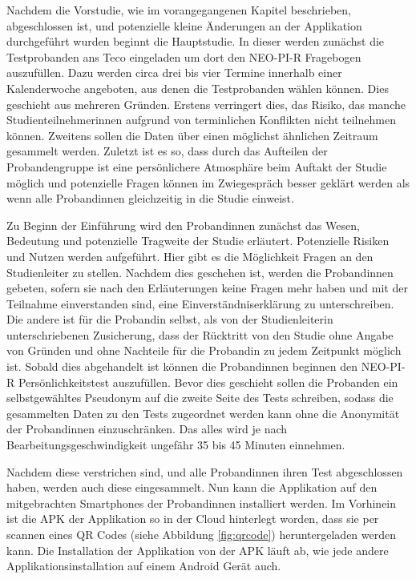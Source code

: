 Nachdem die Vorstudie, wie im vorangegangenen Kapitel beschrieben, abgeschlossen ist, und potenzielle kleine Änderungen an der Applikation durchgeführt wurden beginnt die Hauptstudie.
In dieser werden zunächst die Testprobanden ans Teco eingeladen um dort den NEO-PI-R Fragebogen auszufüllen.
Dazu werden circa drei bis vier Termine innerhalb einer Kalenderwoche angeboten, aus denen die Testprobanden wählen können.
Dies geschieht aus mehreren Gründen. 
Erstens verringert dies, das Risiko, das manche Studienteilnehmerinnen aufgrund von terminlichen Konflikten nicht teilnehmen können.
Zweitens sollen die Daten über einen möglichst ähnlichen Zeitraum gesammelt werden.
Zuletzt ist es so, dass durch das Aufteilen der Probandengruppe ist eine persönlichere Atmosphäre beim Auftakt der Studie möglich
und potenzielle Fragen können im Zwiegespräch besser geklärt werden als wenn alle Probandinnen gleichzeitig in die Studie einweist.
\par
Zu Beginn der Einführung wird den Probandinnen zunächst das Wesen, Bedeutung und potenzielle Tragweite der Studie erläutert.
Potenzielle Risiken und Nutzen werden aufgeführt.
Hier gibt es die Möglichkeit Fragen an den Studienleiter zu stellen.
Nachdem dies geschehen ist, werden die Probandinnen gebeten, sofern sie nach den Erläuterungen keine Fragen mehr haben und mit der Teilnahme einverstanden sind, eine Einverständniserklärung zu unterschreiben.
Die andere ist für die Probandin selbst, als von der Studienleiterin unterschriebenen Zusicherung, dass der Rücktritt von den Studie ohne Angabe von Gründen und ohne Nachteile für die Probandin zu jedem Zeitpunkt möglich ist.
Sobald dies abgehandelt ist können die Probandinnen beginnen den NEO-PI-R Persönlichkeitstest auszufüllen.
Bevor dies geschieht sollen die Probanden ein selbstgewähltes Pseudonym auf die zweite Seite des Tests schreiben, sodass die gesammelten Daten zu den Tests zugeordnet werden kann ohne die Anonymität der Probandinnen einzuschränken.
Das alles wird je nach Bearbeitungsgeschwindigkeit ungefähr 35 bis 45 Minuten einnehmen.
\par
Nachdem diese verstrichen sind, und alle Probandinnen ihren Test abgeschlossen haben, werden auch diese eingesammelt.
Nun kann die Applikation auf den mitgebrachten Smartphones der Probandinnen installiert werden.
Im Vorhinein ist die APK der Applikation so in der Cloud hinterlegt worden, dass sie per scannen eines QR Codes (siehe Abbildung \ref{fig:qrcode}) heruntergeladen werden kann.
Die Installation der Applikation von der APK läuft ab, wie jede andere Applikationsinstallation auf einem Android Gerät auch.
